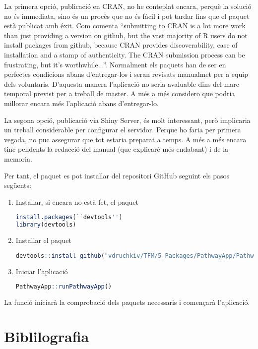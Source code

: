 \documentclass[]{article}
\begin{document}
La primera opció, publicació en CRAN, no he conteplat encara, perquè la solució no és immediata, sino és un procès que no és fàcil i pot tardar fins que el paquet està publicat amb éxit. Com comenta \cite{HWick} \enquote{submitting to CRAN is a lot more work than just providing a version on github, but the vast majority of R users do not install packages from github, because CRAN provides discoverability, ease of installation and a stamp of authenticity. The CRAN submission process can be frustrating, but it’s worthwhile...}. Normalment els paquets han de ser en perfectes condicions abans d'entregar-los i seran revisats  manualmet per a equip dels voluntaris.  D'aquesta manera l'aplicació no seria avaluable dins del marc temporal previst per a treball de master. A més a més considero que podria millorar encara més l'aplicació abans d'entregar-lo.

La segona opció, publicació via Shiny Server, és molt interessant, però implicaria un treball considerable per configurar el servidor. Perque ho faria per primera vegada, no puc assegurar que tot estaria preparat a temps. A més a més encara tinc pendents la redacció del manual (que explicaré més endabant) i de la memoria. 

Per tant, el paquet  es pot installar del repositori GitHub seguint els pasos següents:

\begin{enumerate}
\item Installar, si encara no està fet, el paquet 

\begin{lstlisting}[language=R]
install.packages(``devtools'')
library(devtools)
\end{lstlisting}


\item Installar el paquet 

\begin{lstlisting}[language=R]
devtools::install_github("vdruchkiv/TFM/5_Packages/PathwayApp/PathwayApp")
\end{lstlisting}

\item Iniciar l'aplicació 
\begin{lstlisting}[language=R]
PathwayApp::runPathwayApp()
\end{lstlisting}
\end{enumerate}

La funció  iniciarà la comprobació dels paquets necessaris i començarà l'aplicació. 

\section*{Biblilografia}

\begingroup
\renewcommand{\section}[2]{}%

\endgroup

\end{document}
